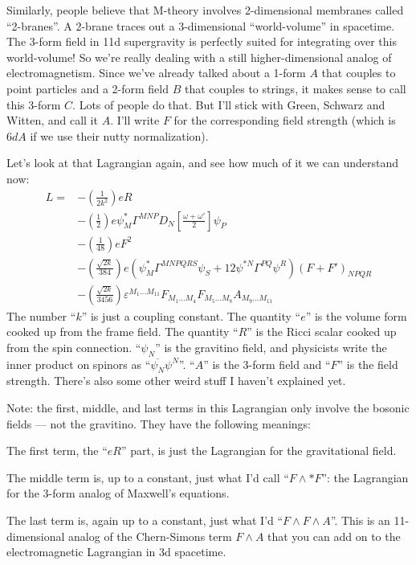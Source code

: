 \documentclass{article}
\begin{document}
Similarly, people believe that M-theory involves 2-dimensional membranes
called ``2-branes''. A 2-brane traces out a 3-dimensional
``world-volume'' in spacetime. The 3-form field in 11d supergravity is
perfectly suited for integrating over this world-volume! So we're really
dealing with a still higher-dimensional analog of electromagnetism.
Since we've already talked about a 1-form \(A\) that couples to point
particles and a 2-form field \(B\) that couples to strings, it makes
sense to call this 3-form \(C\). Lots of people do that. But I'll stick
with Green, Schwarz and Witten, and call it \(A\). I'll write \(F\) for
the corresponding field strength (which is \(6dA\) if we use their nutty
normalization).

Let's look at that Lagrangian again, and see how much of it we can
understand now: \[
  \begin{aligned}
    L =
    &- \left(\frac{1}{2k^2}\right) eR
  \\&- \left(\frac{1}{2}\right) e\psi_M^* \Gamma^{MNP} D_N\left[\frac{\omega+\omega'}{2}\right]\psi_P
  \\&- \left(\frac{1}{48}\right) eF^2
  \\&- \left(\frac{\sqrt{2k}}{384}\right) e(\psi_M^* \Gamma^{MNPQRS}\psi_S + 12\psi^{*N}\Gamma^{PQ}\psi^R)(F+F')_{NPQR}
  \\&- \left(\frac{\sqrt{2k}}{3456}\right) \varepsilon^{M_1\ldots M_{11}}F_{M_1\ldots M_4}F_{M_5\ldots M_8}A_{M_9\ldots M_{11}}
  \end{aligned}
\] The number ``\(k\)'' is just a coupling constant. The quantity
``\(e\)'' is the volume form cooked up from the frame field. The
quantity ``\(R\)'' is the Ricci scalar cooked up from the spin
connection. ``\(\psi_N\)'' is the gravitino field, and physicists write
the inner product on spinors as ``\(\overline{\psi_N} \psi^N\)''.
``\(A\)'' is the 3-form field and ``\(F\)'' is the field strength.
There's also some other weird stuff I haven't explained yet.

Note: the first, middle, and last terms in this Lagrangian only involve
the bosonic fields --- not the gravitino. They have the following
meanings:

The first term, the ``\(e R\)'' part, is just the Lagrangian for the
gravitational field.

The middle term is, up to a constant, just what I'd call
``\(F\wedge*F\)'': the Lagrangian for the 3-form analog of Maxwell's
equations.

The last term is, again up to a constant, just what I'd
``\(F\wedge F\wedge A\)''. This is an 11-dimensional analog of the
Chern-Simons term \(F\wedge A\) that you can add on to the
electromagnetic Lagrangian in 3d spacetime.
\end{document}
